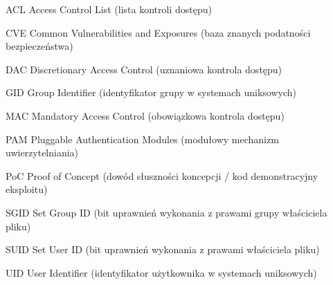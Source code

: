 \UnnumberedChapter{\abbrevname}

\begin{abbreviations}
    \item[ACL]  Access Control List (lista kontroli dostępu)
    \item[CVE]  Common Vulnerabilities and Exposures (baza znanych podatności bezpieczeństwa)
    \item[DAC]  Discretionary Access Control (uznaniowa kontrola dostępu)
    \item[GID]  Group Identifier (identyfikator grupy w systemach uniksowych)
    \item[MAC]  Mandatory Access Control (obowiązkowa kontrola dostępu)
    \item[PAM]  Pluggable Authentication Modules (modułowy mechanizm uwierzytelniania)
    \item[PoC]  Proof of Concept (dowód słuszności koncepcji / kod demonstracyjny eksploitu)
    \item[SGID] Set Group ID (bit uprawnień wykonania z prawami grupy właściciela pliku)
    \item[SUID] Set User ID (bit uprawnień wykonania z prawami właściciela pliku)
    \item[UID]  User Identifier (identyfikator użytkownika w systemach uniksowych)
\end{abbreviations}
